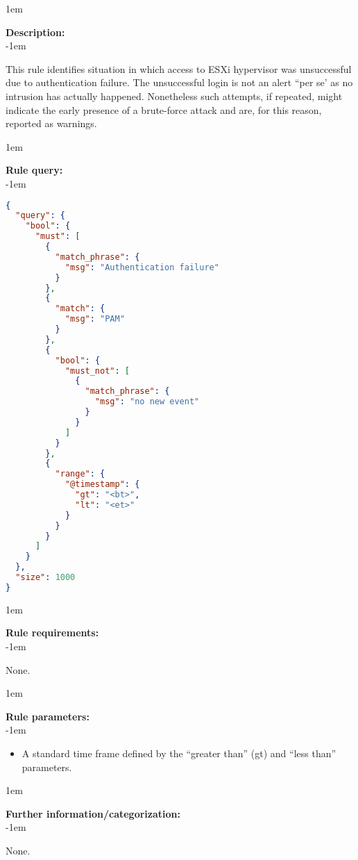 \openup 1em

{\bf Description:} \\

\openup -1em
\vspace{-2em}


This rule identifies situation in which access to ESXi hypervisor was unsuccessful due to authentication failure. The unsuccessful login is not an alert ``per se' as no intrusion has actually happened. Nonetheless such attempts, if repeated, might indicate the early presence of a brute-force attack and are, for this reason, reported as warnings.

\openup 1em

{\bf Rule query:} \\

\openup -1em
\vspace{-2em}

\begin{lstlisting}[language=json,firstnumber=1]
{
  "query": {
    "bool": {
      "must": [
        {
          "match_phrase": {
            "msg": "Authentication failure"
          }
        },
        {
          "match": {
            "msg": "PAM"
          }
        },
        {
          "bool": {
            "must_not": [
              {
                "match_phrase": {
                  "msg": "no new event"
                }
              }
            ]
          }
        },
        {
          "range": {
            "@timestamp": {
              "gt": "<bt>",
              "lt": "<et>"
            }
          }
        }
      ]
    }
  },
  "size": 1000
}
\end{lstlisting}

\openup 1em

{\bf Rule requirements:} \\

\openup -1em
\vspace{-2em}

None.

\openup 1em

{\bf Rule parameters:} \\

\openup -1em
\vspace{-2em}

\begin{itemize}
	\item A standard time frame defined by the ``greater than'' (gt) and ``less than'' parameters.
\end{itemize}

\openup 1em

{\bf Further information/categorization:} \\

\openup -1em
\vspace{-2em}

None.

\pagebreak
